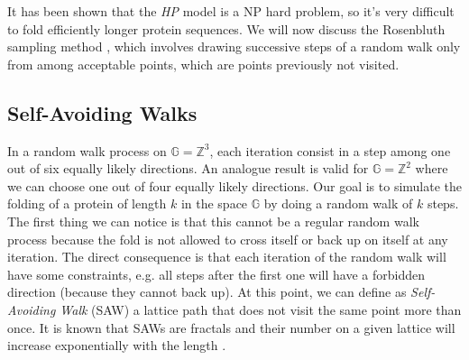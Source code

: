 It has been shown that the \emph{HP} model is a NP hard problem, so it's very difficult to fold efficiently longer protein sequences.
We will now discuss the Rosenbluth sampling method \cite{PERM}, which involves drawing successive steps of a random walk only from among acceptable points, which are points previously not visited.

\subsection{Self-Avoiding Walks}
In a random walk process on $\mathbb{G} = \mathbb{Z}^3$, each iteration consist in a step among one out of six equally likely directions.
An analogue result is valid for $\mathbb{G} = \mathbb{Z}^2$ where we can choose one out of four equally likely directions.
Our goal is to simulate the folding of a protein of length $k$ in the space $\mathbb{G}$ by doing a random walk of $k$ steps.
The first thing we can notice is that this cannot be a regular random walk process because the fold is not allowed to cross itself or back up on itself at any iteration.
The direct consequence is that each iteration of the random walk will have some constraints, e.g. all steps after the first one will have a forbidden direction (because they cannot back up).
At this point, we can define as \emph{Self-Avoiding Walk} (SAW) a lattice path that does not visit the same point more than once.
It is known that SAWs are fractals and their number on a given lattice will increase exponentially with the length \cite{madras1988pivot}.

